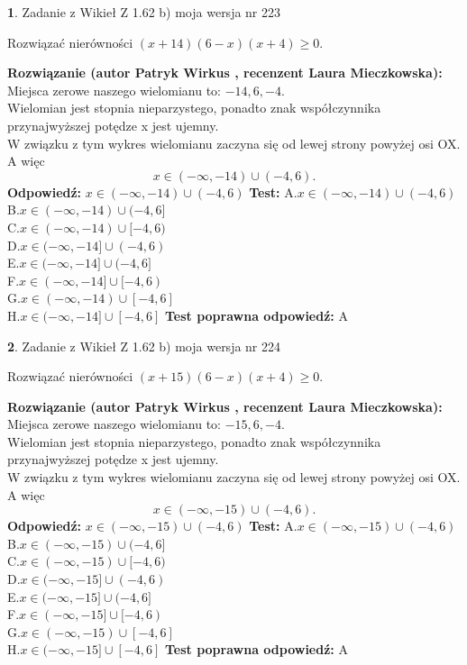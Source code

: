 \documentclass[12pt, a4paper]{article}
\theoremstyle{definition} %
\newtheorem{zad}{}
\newcommand{\zadStart}[1]{\begin{zad}#1\newline}
\newcommand{\zadStop}{\end{zad}}
\newcommand{\rozwStart}[2]{\noindent \textbf{Rozwiązanie (autor #1 , recenzent #2): }\newline}
\newcommand{\rozwStop}{\newline}
\newcommand{\odpStart}{\noindent \textbf{Odpowiedź:}\newline}
\newcommand{\odpStop}{\newline}
\newcommand{\testStart}{\noindent \textbf{Test:}\newline}
\newcommand{\testStop}{\newline}
\newcommand{\kluczStart}{\noindent \textbf{Test poprawna odpowiedź:}\newline}
\newcommand{\kluczStop}{\newline}
\begin{document}
\zadStart{Zadanie z Wikieł Z 1.62 b) moja wersja nr 223}

Rozwiązać nierówności $(x+14)(6-x)(x+4)\ge0$.
\zadStop
\rozwStart{Patryk Wirkus}{Laura Mieczkowska}
Miejsca zerowe naszego wielomianu to: $-14, 6, -4$.\\
Wielomian jest stopnia nieparzystego, ponadto znak współczynnika przy\linebreak najwyższej potędze x jest ujemny.\\ W związku z tym wykres wielomianu zaczyna się od lewej strony powyżej osi OX. A więc $$x \in (-\infty,-14) \cup (-4,6).$$
\rozwStop
\odpStart
$x \in (-\infty,-14) \cup (-4,6)$
\odpStop
\testStart
A.$x \in (-\infty,-14) \cup (-4,6)$\\
B.$x \in (-\infty,-14) \cup (-4,6]$\\
C.$x \in (-\infty,-14) \cup [-4,6)$\\
D.$x \in (-\infty,-14] \cup (-4,6)$\\
E.$x \in (-\infty,-14] \cup (-4,6]$\\
F.$x \in (-\infty,-14] \cup [-4,6)$\\
G.$x \in (-\infty,-14) \cup [-4,6]$\\
H.$x \in (-\infty,-14] \cup [-4,6]$
\testStop
\kluczStart
A
\kluczStop



\zadStart{Zadanie z Wikieł Z 1.62 b) moja wersja nr 224}

Rozwiązać nierówności $(x+15)(6-x)(x+4)\ge0$.
\zadStop
\rozwStart{Patryk Wirkus}{Laura Mieczkowska}
Miejsca zerowe naszego wielomianu to: $-15, 6, -4$.\\
Wielomian jest stopnia nieparzystego, ponadto znak współczynnika przy\linebreak najwyższej potędze x jest ujemny.\\ W związku z tym wykres wielomianu zaczyna się od lewej strony powyżej osi OX. A więc $$x \in (-\infty,-15) \cup (-4,6).$$
\rozwStop
\odpStart
$x \in (-\infty,-15) \cup (-4,6)$
\odpStop
\testStart
A.$x \in (-\infty,-15) \cup (-4,6)$\\
B.$x \in (-\infty,-15) \cup (-4,6]$\\
C.$x \in (-\infty,-15) \cup [-4,6)$\\
D.$x \in (-\infty,-15] \cup (-4,6)$\\
E.$x \in (-\infty,-15] \cup (-4,6]$\\
F.$x \in (-\infty,-15] \cup [-4,6)$\\
G.$x \in (-\infty,-15) \cup [-4,6]$\\
H.$x \in (-\infty,-15] \cup [-4,6]$
\testStop
\kluczStart
A
\kluczStop
\end{document}
